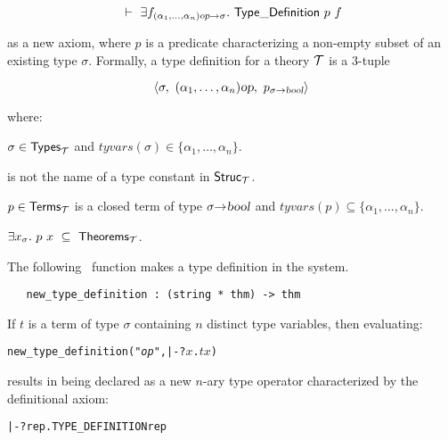 \[\turn \equant{f_{(\alpha_1,\ldots,\alpha_n)\ty{op}\fun\sigma}}\TyDef\ p\ f\]

\noindent as a new axiom, where $p$ is a predicate
characterizing a
non-empty subset of an existing type $\sigma$.  Formally, a type definition
for a theory ${\cal T}$ is a $3$-tuple

\[ \langle \sigma,\ (\alpha_1,\ldots,\alpha_n)\ty{op},
    \ p_{\sigma\fun\ty{bool}}\rangle \]

\noindent where:

\begin{myenumerate}
\item $\sigma\in{\sf Types}_{\cal T}$  and
$tyvars(\sigma)\in\{\alpha_1, \ldots , \alpha_n\}$.
\item {} is not the name of a type constant in ${\sf Struc}_{\cal T}$.
\item $p\in{\sf Terms}_{\cal T}$ is a closed term of
type $\sigma{\to}\textsl{bool}$  and
$tyvars(p)\subseteq\{\alpha_1, \ldots , \alpha_n\}$.
\item $\exists x_{\sigma}.\ p\ x \ \subseteq\ {\sf Theorems}_{\cal T}$.
\end{myenumerate}

The following \ML\ function makes a type definition in the \HOL{} system.

\begin{holboxed}
\begin{verbatim}
   new_type_definition : (string * thm) -> thm
\end{verbatim}\end{holboxed}

\noindent If $t$ is a term of type
$\sigma$ containing $n$ distinct type variables, then
evaluating:

{\def\op{{\normalsize\sl op}}
\begin{hol}
\begin{alltt}
   new_type_definition("{\op}", |- ?\(x\). \(t\) \(x\))
\end{alltt}
\end{hol}}

\noindent results in  being declared as a new $n$-ary type operator
characterized by the definitional
 axiom:
\begin{hol}
\begin{alltt}
   |- ?rep. TYPE\_DEFINITION  rep
\end{alltt}
\end{hol}

